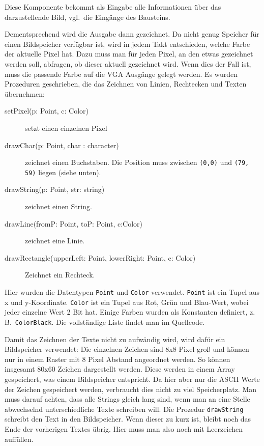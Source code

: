 \documentclass[IN,ngerman,utf8,12pt]{tumbook}
\newcommand{\zB}{z.\,B.\ }
\newcommand{\vgl}{vgl.\ }
\begin{document}
Diese Komponente bekommt als Eingabe alle Informationen über das darzustellende Bild, \vgl die Eingänge des Bausteins.

Dementsprechend wird die Ausgabe dann gezeichnet.
Da nicht genug Speicher für einen Bildspeicher verfügbar ist, wird in jedem Takt entschieden, welche Farbe der aktuelle Pixel hat.
Dazu muss man für jeden Pixel, an den etwas gezeichnet werden soll, abfragen, ob dieser aktuell gezeichnet wird.
Wenn dies der Fall ist, muss die passende Farbe auf die VGA Ausgänge gelegt werden.
Es wurden Prozeduren geschrieben, die das Zeichnen von Linien, Rechtecken und Texten übernehmen:

\begin{description}
    \item[setPixel(p: Point, c: Color)] setzt einen einzelnen Pixel
    \item[drawChar(p: Point, char : character)] zeichnet einen Buchstaben.
        Die Position muss zwischen \texttt{(0,0)} und \texttt{(79, 59)} liegen (siehe unten).
    \item[drawString(p: Point, str: string)] zeichnet einen String.
    \item[drawLine(fromP: Point, toP: Point, c:Color)] zeichnet eine Linie.
    \item[drawRectangle(upperLeft: Point, lowerRight: Point, c: Color)] Zeichnet ein Rechteck.
\end{description}

Hier wurden die Datentypen \texttt{Point} und \texttt{Color} verwendet.
\texttt{Point} ist ein Tupel aus x und y-Koordinate.
\texttt{Color} ist ein Tupel aus Rot, Grün und Blau-Wert, wobei jeder einzelne Wert 2 Bit hat.
Einige Farben wurden als Konstanten definiert, \zB \texttt{ColorBlack}.
Die vollständige Liste findet man im Quellcode.

Damit das Zeichnen der Texte nicht zu aufwändig wird, wird dafür ein Bildspeicher verwendet:
Die einzelnen Zeichen sind 8x8 Pixel groß und können nur in einem Raster mit 8 Pixel Abstand angeordnet werden.
So können insgesamt 80x60 Zeichen dargestellt werden.
Diese werden in einem Array gespeichert, was einem Bildspeicher entspricht.
Da hier aber nur die ASCII Werte der Zeichen gespeichert werden, verbraucht dies nicht zu viel Speicherplatz.
Man muss darauf achten, dass alle Strings gleich lang sind, wenn man an eine Stelle abwechselnd unterschiedliche Texte schreiben will.
Die Prozedur \texttt{drawString} schreibt den Text in den Bildspeicher.
Wenn dieser zu kurz ist, bleibt noch das Ende der vorherigen Textes übrig.
Hier muss man also noch mit Leerzeichen auffüllen.
\end{document}
